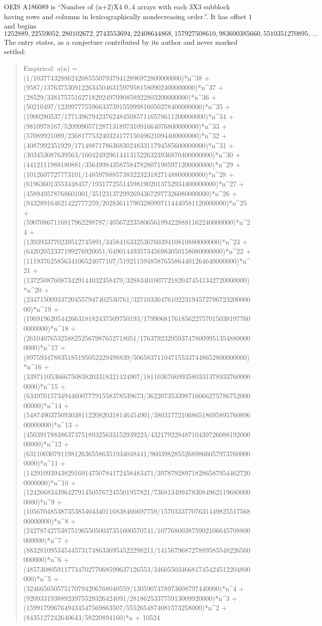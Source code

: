 \documentclass[11pt,a4paper]{article}
\theoremstyle{plain}
\theoremstyle{definition}
\begin{document}
OEIS A186089 is ``Number of (n+2)X4 0..4 arrays with each 3X3 subblock having rows and columns in lexicographically nondecreasing order.''. It has offset $1$ and begins
\[
1252889, 22559052, 280102672, 2743553694, 22408644868, 157927508610, 983600385660, 5510351270895,\ \dots
\]
The entry states, as a conjecture contributed by its author and never marked settled:
\begin{quote}\raggedright\small
Empirical: a(n) = (1/1037743288624208555079379412896972800000000)*n\^{}38 + (9587/13763753091226345046315979581580902400000000)*n\^{}37 + (28529/33817575162718292497090858922803200000000)*n\^{}36 + (50210497/123997775596633739155999816050278400000000)*n\^{}35 + (1900280537/17713967942376248450857116578611200000000)*n\^{}34 + (9810978167/520999057128713189731091664076800000000)*n\^{}33 + (57089921089/23681775324032417715049621094400000000)*n\^{}32 + (4087992351929/17148871786368302483311794585600000000)*n\^{}31 + (303453087639563/16042492961441315226323936870400000000)*n\^{}30 + (4412111988180881/3564998435875847828071985971200000000)*n\^{}29 + (1012607727773101/14859788857383223231827148800000000)*n\^{}28 + (619636013553448457/193177255145981902013752934400000000)*n\^{}27 + (458949578768601001/3512313729926943672977326080000000)*n\^{}26 + (943289164621422777259/202836117903280997114440581120000000)*n\^{}25 + (59070867116817962298787/405672235806561994228881162240000000)*n\^{}24 + (1393933770239512745891/345841633253676039410810880000000)*n\^{}23 + (64202052337199276920051/649014493573456983050158080000000)*n\^{}22 + (11193762585634106524077107/5192115948587655864401264640000000)*n\^{}21 + (1372508760873429144032358479/32883401007721820474541342720000000)*n\^{}20 + (234715009337204557947402530761/327103304761022319457279672320000000)*n\^{}19 + (196919620544266318182437509750193/17990681761856227570150381977600000000)*n\^{}18 + (26104076532588252567987652718051/176379232959374780099513548800000000)*n\^{}17 + (897593478835185195052329498839/506583711047155337448652800000000)*n\^{}16 + (339711053666750838203318321424907/18110367669935803313789337600000000)*n\^{}15 + (6349701573494460077791558378539673/36220735339871606627578675200000000)*n\^{}14 + (548749037509303811220820318146454901/380317721068651869589576089600000000)*n\^{}13 + (45039178838637375189325633152939223/4321792284871043972608819200000000)*n\^{}12 + (63110030791198126365586351934048441/960398285526898660579737600000000)*n\^{}11 + (1429109394382916914750784172458483471/3978792897182865879544627200000000)*n\^{}10 + (124266834396427914505767245501957821/73681349947830849621196800000000)*n\^{}9 + (10567048538735385404340116838466697759/1570333770763144982551756800000000)*n\^{}8 + (2427874275387519655050037351600570741/107768003875902106645708800000000)*n\^{}7 + (8832810953454457317486336954522298211/141567968727889585548226560000000)*n\^{}6 + (485730805911773470277068599637126553/3460550346681745424512204800000)*n\^{}5 + (324665650575170794206768040559/1305907478973608797440000)*n\^{}4 + (92093319388923975529326424091/281862533775913009920000)*n\^{}3 + (1599179967649434547569863507/5552654874081573258000)*n\^{}2 + (8435127242640643/58220894160)*n + 10524
\end{quote}
\end{document}
